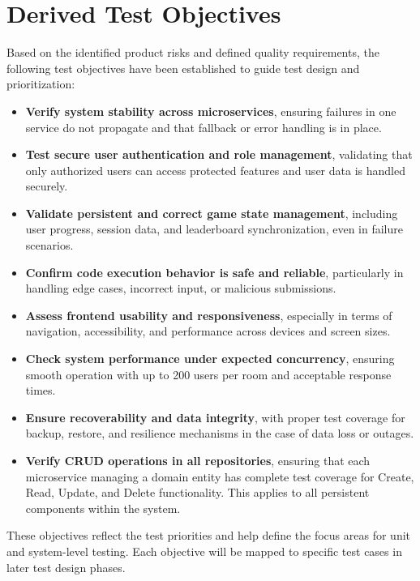 \section{Derived Test Objectives}
\label{section-derived-test-objectives}

Based on the identified product risks and defined quality requirements, the following test objectives have been established to guide test design and prioritization:

\begin{itemize}
    \item \textbf{Verify system stability across microservices}, ensuring failures in one service do not propagate and that fallback or error handling is in place.

    \item \textbf{Test secure user authentication and role management}, validating that only authorized users can access protected features and user data is handled securely.

    \item \textbf{Validate persistent and correct game state management}, including user progress, session data, and leaderboard synchronization, even in failure scenarios.

    \item \textbf{Confirm code execution behavior is safe and reliable}, particularly in handling edge cases, incorrect input, or malicious submissions.

    \item \textbf{Assess frontend usability and responsiveness}, especially in terms of navigation, accessibility, and performance across devices and screen sizes.

    \item \textbf{Check system performance under expected concurrency}, ensuring smooth operation with up to 200 users per room and acceptable response times.

    \item \textbf{Ensure recoverability and data integrity}, with proper test coverage for backup, restore, and resilience mechanisms in the case of data loss or outages.

    \item \textbf{Verify CRUD operations in all repositories}, ensuring that each microservice managing a domain entity has complete test coverage for Create, Read, Update, and Delete functionality. This applies to all persistent components within the system.
\end{itemize}

These objectives reflect the test priorities and help define the focus areas for unit and system-level testing. Each objective will be mapped to specific test cases in later test design phases.
